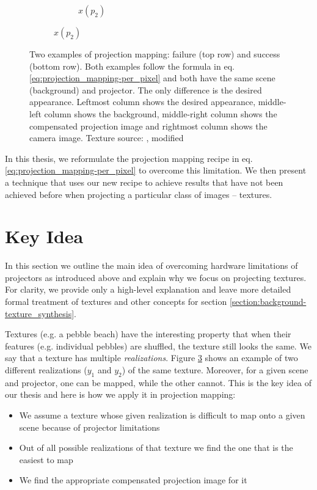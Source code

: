 \begin{figure}[ht]
\begin{subfigure}{\textwidth}
\begin{subfigure}{0.2\textwidth}
            \caption*{\(x(p_2)\)}
            \label{fig:intro_pixels_vs_stats-stats_proj}
        \end{subfigure}
    \end{subfigure}
    \caption{Two examples of projection mapping: failure (top row) and success (bottom row). Both examples follow the formula in eq. \ref{eq:projection_mapping-per_pixel} and both have the same scene (background) and projector. The only difference is the desired appearance. Leftmost column shows the desired appearance, middle-left column shows the background, middle-right column shows the compensated projection image and rightmost column shows the camera image. Texture source: \citet{Gatys2015}, modified}
    \label{fig:intro_pixels_vs_stats}
\end{figure}

In this thesis, we reformulate the projection mapping recipe in eq. \ref{eq:projection_mapping-per_pixel} to overcome this limitation. We then present a technique that uses our new recipe to achieve results that have not been achieved before when projecting a particular class of images -- textures.

\section{Key Idea}
\label{section:intro-key_idea}

In this section we outline the main idea of overcoming hardware limitations of projectors as introduced above and explain why we focus on projecting textures. For clarity, we provide only a high-level explanation and leave more detailed formal treatment of textures and other concepts for section \ref{section:background-texture_synthesis}.

Textures (e.g. a pebble beach) have the interesting property that when their features (e.g. individual pebbles) are shuffled, the texture still looks the same. We say that a texture has multiple \textit{realizations}. Figure \ref{fig:intro_pixels_vs_stats} shows an example of two different realizations (\(y_1\) and \(y_2\)) of the same texture. Moreover, for a given scene and projector, one can be mapped, while the other cannot. This is the key idea of our thesis and here is how we apply it in projection mapping:

\begin{itemize}
    \item We assume a texture whose given realization is difficult to map onto a given scene because of projector limitations
    \item Out of all possible realizations of that texture we find the one that is the easiest to map
    \item We find the appropriate compensated projection image for it
\end{itemize}

